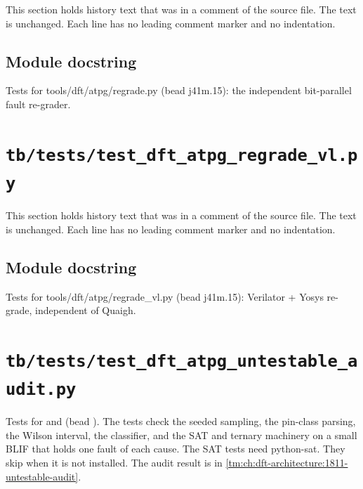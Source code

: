 This section holds history text that was in a comment of the source file. The text is unchanged. Each line has no leading comment marker and no indentation.

\begin{record}

\subsection*{Module docstring}

\begin{textblock}
Tests for tools/dft/atpg/regrade.py (bead j41m.15): the independent bit-parallel fault re-grader.
\end{textblock}

\end{record}

\section{\texttt{tb/tests/test\_dft\_atpg\_regrade\_vl.py}}\label{cr:suite:test-dft-atpg-regrade-vl}

This section holds history text that was in a comment of the source file. The text is unchanged. Each line has no leading comment marker and no indentation.

\begin{record}

\subsection*{Module docstring}

\begin{textblock}
Tests for tools/dft/atpg/regrade_vl.py (bead j41m.15): Verilator + Yosys re-grade, independent of Quaigh.
\end{textblock}

\end{record}

\section{\texttt{tb/tests/test\_dft\_atpg\_untestable\_audit.py}}\label{cr:suite:test-dft-atpg-untestable-audit}

Tests for  and
 (bead ). The tests
check the seeded sampling, the pin-class parsing, the Wilson interval,
the classifier, and the SAT and ternary machinery on a small BLIF that
holds one fault of each cause. The SAT tests need python-sat. They skip
when it is not installed. The audit result is in
\cref{tm:ch:dft-architecture:1811-untestable-audit}.

